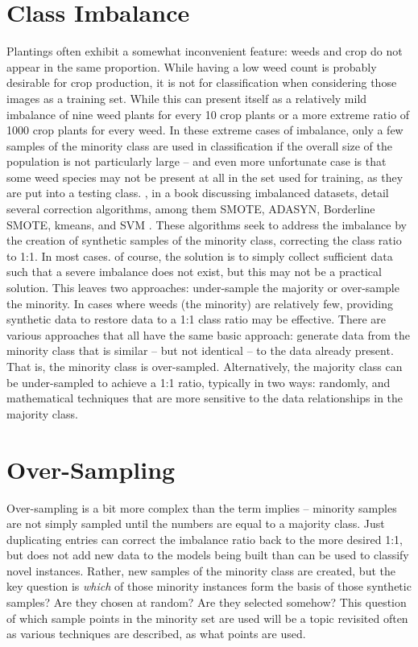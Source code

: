 \documentclass[letterpaper]{article}
\begin{document}
\section{Class Imbalance}
Plantings often exhibit a somewhat inconvenient feature: weeds and crop do not appear in the same proportion. While having a low weed count is probably desirable for crop production, it is not for classification when considering those images as a training set. While this can present itself as a relatively mild imbalance of nine weed plants for every 10 crop plants or a more extreme ratio of 1000 crop plants for every weed. In these extreme cases of imbalance, only a few samples of the minority class are used in classification if the overall size of the population is not particularly large -- and even more unfortunate case is that some weed species may not be present at all in the set used for training, as they are put into a testing class. \citeauthor{Fernandez2018-fw}, in a book discussing imbalanced datasets, detail several correction algorithms, among them SMOTE, ADASYN, Borderline SMOTE, kmeans, and SVM \parencite{Fernandez2018-fw}. These algorithms seek to address the imbalance by the creation of synthetic samples of the minority class, correcting the class ratio to 1:1.  In most cases. of course, the solution is to simply collect sufficient data such that a severe imbalance does not exist, but this may not be a practical solution. This leaves two approaches: under-sample the majority or over-sample the minority. In cases where weeds (the minority) are relatively few, providing synthetic data to restore data to a 1:1 class ratio may be effective. There are various approaches that all have the same basic approach: generate data from the minority class that is similar -- but not identical -- to the data already present. That is, the minority class is over-sampled.  Alternatively, the majority class can be under-sampled to achieve a 1:1 ratio, typically in two ways: randomly, and mathematical techniques that are more sensitive to the data relationships in the majority class.

\section{Over-Sampling}
\label{section:over}
Over-sampling is a bit more complex than the term implies -- minority samples are not simply sampled until the numbers are equal to a majority class. Just duplicating entries can correct the imbalance ratio back to the more desired 1:1, but does not add new data to the models being built than can be used to classify novel instances. Rather, new samples of the minority class are created, but the key question is \textit{which} of those minority instances form the basis of those synthetic samples? Are they chosen at random? Are they selected somehow?  This question of which sample points in the minority set are used will be a topic revisited often as various techniques are described, as what points are used.
\end{document}
